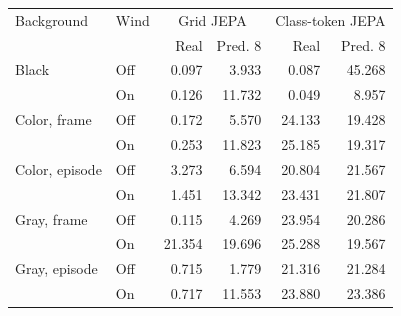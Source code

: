 \begin{tabular}{llrrrr}
\toprule
\rowcolor{Navy!8}
Background & Wind & \multicolumn{2}{c}{Grid JEPA} & \multicolumn{2}{c}{Class-token JEPA} \\
 & & Real & Pred. 8 & Real & Pred. 8 \\
\midrule
Black & Off & 0.097 & 3.933 & 0.087 & 45.268 \\
 & On & 0.126 & 11.732 & 0.049 & 8.957 \\
Color, frame & Off & 0.172 & 5.570 & 24.133 & 19.428 \\
 & On & 0.253 & 11.823 & 25.185 & 19.317 \\
Color, episode & Off & 3.273 & 6.594 & 20.804 & 21.567 \\
 & On & 1.451 & 13.342 & 23.431 & 21.807 \\
Gray, frame & Off & 0.115 & 4.269 & 23.954 & 20.286 \\
 & On & 21.354 & 19.696 & 25.288 & 19.567 \\
Gray, episode & Off & 0.715 & 1.779 & 21.316 & 21.284 \\
 & On & 0.717 & 11.553 & 23.880 & 23.386 \\
\bottomrule
\end{tabular}
